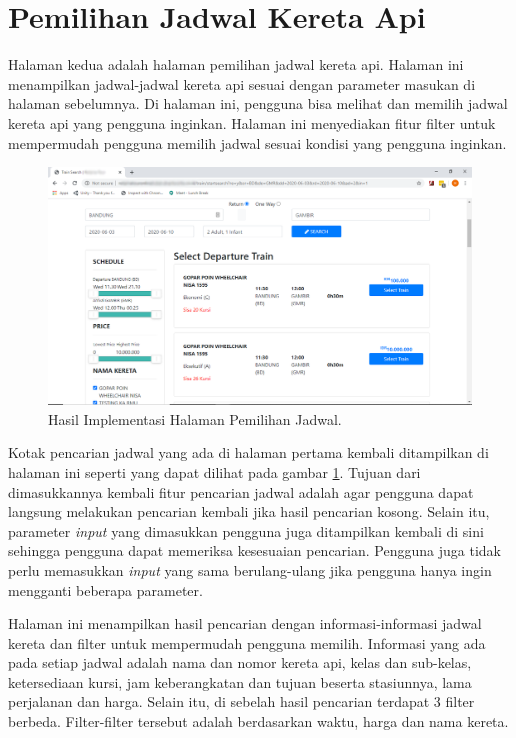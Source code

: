 \section{Pemilihan Jadwal Kereta Api}
\label{sec:pemilihanjadwal}

Halaman kedua adalah halaman pemilihan jadwal kereta api. Halaman ini menampilkan jadwal-jadwal kereta api sesuai dengan parameter masukan di halaman sebelumnya. Di halaman ini, pengguna bisa melihat dan memilih jadwal kereta api yang pengguna inginkan. Halaman ini menyediakan fitur filter untuk mempermudah pengguna memilih jadwal sesuai kondisi yang pengguna inginkan. 

\begin{figure}[H]
        \center
        \includegraphics[width=\textwidth,height=\textheight,keepaspectratio]{Gambar/Search result pilih jadwal berangkat.png}
        \caption{Hasil Implementasi Halaman Pemilihan Jadwal.}
            \label{img:implementasijadwalberangkat}
        \end{figure}

Kotak pencarian jadwal yang ada di halaman pertama kembali ditampilkan di halaman ini seperti yang dapat dilihat pada gambar \ref{img:implementasijadwalberangkat}. Tujuan dari dimasukkannya kembali fitur pencarian jadwal adalah agar pengguna dapat langsung melakukan pencarian kembali jika hasil pencarian kosong. Selain itu, parameter \textit{input} yang dimasukkan pengguna juga ditampilkan kembali di sini sehingga pengguna dapat memeriksa kesesuaian pencarian. Pengguna juga tidak perlu memasukkan \textit{input} yang sama berulang-ulang jika pengguna hanya ingin mengganti beberapa parameter.

Halaman ini menampilkan hasil pencarian dengan informasi-informasi jadwal kereta dan filter untuk mempermudah pengguna memilih. Informasi yang ada pada setiap jadwal adalah nama dan nomor kereta api, kelas dan sub-kelas, ketersediaan kursi, jam keberangkatan dan tujuan beserta stasiunnya, lama perjalanan dan harga. Selain itu, di sebelah hasil pencarian terdapat 3 filter berbeda. Filter-filter tersebut adalah berdasarkan waktu, harga dan nama kereta.

